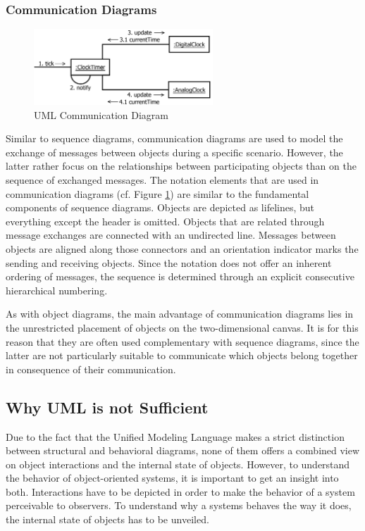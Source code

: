 \subsubsection{Communication Diagrams}

\begin{figure}
	\centering
	\includegraphics[width=0.6\textwidth]{../images/02-Communication}
	\caption{UML Communication Diagram}
	\label{fig:BackgroundModelingCommunication}
\end{figure}

Similar to sequence diagrams, communication diagrams \cite{rumbaugh_unified_2010} are used to model the exchange of messages between objects during a specific scenario.
However, the latter rather focus on the relationships between participating objects than on the sequence of exchanged messages.
The notation elements that are used in communication diagrams (cf. Figure \ref{fig:BackgroundModelingCommunication}) are similar to the fundamental components of sequence diagrams.
Objects are depicted as lifelines, but everything except the header is omitted.
Objects that are related through message exchanges are connected with an undirected line.
Messages between objects are aligned along those connectors and an orientation indicator marks the sending and receiving objects.
Since the notation does not offer an inherent ordering of messages, the sequence is determined through an explicit consecutive hierarchical numbering.

As with object diagrams, the main advantage of communication diagrams lies in the unrestricted placement of objects on the two-dimensional canvas.
It is for this reason that they are often used complementary with sequence diagrams, since the latter are not particularly suitable to communicate which objects belong together in consequence of their communication.

\subsection{Why UML is not Sufficient}
\label{ss:BackgroundModelingChallenges}
Due to the fact that the Unified Modeling Language makes a strict distinction between structural and behavioral diagrams, none of them offers a combined view on object interactions and the internal state of objects.
However, to understand the behavior of object-oriented systems, it is important to get an insight into both.
Interactions have to be depicted in order to make the behavior of a system perceivable to observers.
To understand why a systems behaves the way it does, the internal state of objects has to be unveiled.

